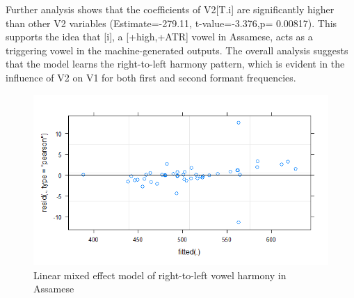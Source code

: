 \documentclass{Interspeech2024}
\begin{document}
Further analysis shows that the coefficients of V2[T.i] are significantly higher than other V2 variables (Estimate=-279.11, t-value=-3.376,p= 0.00817). This supports the idea that [i], a [+high,+ATR] vowel in Assamese, acts as a triggering vowel in the machine-generated outputs. The overall analysis suggests that the model learns the right-to-left harmony pattern, which is evident in the influence of V2 on V1 for both first and second formant frequencies.



 


\begin{figure}
    \centering
    \includegraphics[width=0.75\linewidth]{lm_ATRtrain.png}
    \caption{Linear mixed effect model of right-to-left vowel harmony in Assamese}
    \label{fig:enter-label}
\end{figure}

\begin{table}[!ht]
 \caption{LMER model for the training   dataset}
    \label{tab:my_label}
    \centering
   
\end{table}
\end{document}
